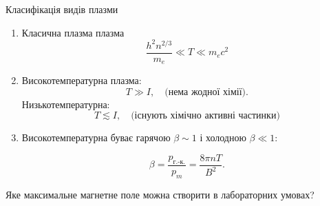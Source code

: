 \documentclass[]{beamer}
\begin{document}
\begin{frame}{Класифікація видів плазми}{}
       \begin{enumerate}
       \item Класична плазма плазма
       \begin{equation*}
           \frac{h^2 n^{2/3}}{m_e} \ll T \ll m_ec^2
       \end{equation*}
       \item Високотемпературна плазма:
       \begin{equation*}
           T \gg I, \quad \text{(нема жодної хімії)}.
       \end{equation*}
       Низькотемпературна:
       \begin{equation*}
           T \lesssim  I, \quad \text{(існують хімічно активні частинки)}
       \end{equation*}
       \item  Високотемпературна буває гарячою $\beta \sim 1$ і холодною $\beta \ll 1$:

       \begin{equation*}
           \beta = \frac{p_\text{г.-к.}}{p_m} = \frac{8\pi n T}{B^2}.
       \end{equation*}

       \end{enumerate}
\begin{exampleblock}{}
    Яке максимальне магнетне поле можна створити в лабораторних умовах?
\end{exampleblock}
\end{frame}
\end{document}
